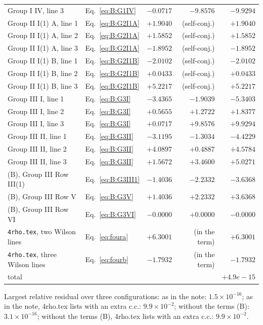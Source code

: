 \documentclass[10pt]{article}
\numberwithin{equation}{section}
\begin{document}
\begin{longtable}{@{}llrrr@{}}
Group I IV, line 3 & Eq.~\eqref{eq:B:G1IV} & $-0.0717$ & $-9.8576$ & $-9.9294$\\
Group II I(1) A, line 1 & Eq.~\eqref{eq:B:G2I1A} & $+1.9040$ & (self-conj.) & $+1.9040$\\
Group II I(1) A, line 2 & Eq.~\eqref{eq:B:G2I1A} & $+1.5852$ & (self-conj.) & $+1.5852$\\
Group II I(1) A, line 3 & Eq.~\eqref{eq:B:G2I1A} & $-1.8952$ & (self-conj.) & $-1.8952$\\
Group II I(1) B, line 1 & Eq.~\eqref{eq:B:G2I1B} & $-2.0102$ & (self-conj.) & $-2.0102$\\
Group II I(1) B, line 2 & Eq.~\eqref{eq:B:G2I1B} & $+0.0433$ & (self-conj.) & $+0.0433$\\
Group II I(1) B, line 3 & Eq.~\eqref{eq:B:G2I1B} & $+5.2217$ & (self-conj.) & $+5.2217$\\
Group III I, line 1 & Eq.~\eqref{eq:B:G3I} & $-3.4365$ & $-1.9039$ & $-5.3403$\\
Group III I, line 2 & Eq.~\eqref{eq:B:G3I} & $+0.5655$ & $+1.2722$ & $+1.8377$\\
Group III I, line 3 & Eq.~\eqref{eq:B:G3I} & $+0.0717$ & $+9.8576$ & $+9.9294$\\
Group III II, line 1 & Eq.~\eqref{eq:B:G3II} & $-3.1195$ & $-1.3034$ & $-4.4229$\\
Group III II, line 2 & Eq.~\eqref{eq:B:G3II} & $+4.0897$ & $+0.4887$ & $+4.5784$\\
Group III II, line 3 & Eq.~\eqref{eq:B:G3II} & $+1.5672$ & $+3.4600$ & $+5.0271$\\
(B), Group III Row III(1) & Eq.~\eqref{eq:B:G3III1} & $-1.4036$ & $-2.2332$ & $-3.6368$\\
(B), Group III Row V & Eq.~\eqref{eq:B:G3V} & $+1.4036$ & $+2.2332$ & $+3.6368$\\
(B), Group III Row VI & Eq.~\eqref{eq:B:G3VI} & $-0.0000$ & $+0.0000$ & $-0.0000$\\
\texttt{4rho.tex}, two Wilson lines & Eq.~\eqref{eq:foura} & $+6.3001$ & (in the term) & $+6.3001$\\
\texttt{4rho.tex}, three Wilson lines & Eq.~\eqref{eq:fourb} & $-1.7932$ & (in the term) & $-1.7932$\\
\midrule
total & & & & $+4.9e-15$\\\bottomrule
\end{longtable}
\noindent Largest relative residual over three configurations: as in the note: $1.5\times10^{-16}$; as in the note, 4rho.tex lists with an extra c.c.: $9.9\times10^{-2}$; without the terms (B): $3.1\times10^{-16}$; without the terms (B), 4rho.tex lists with an extra c.c.: $9.9\times10^{-2}$.
\end{document}

